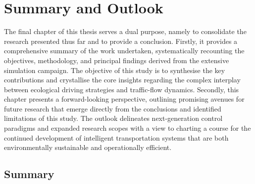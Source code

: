 \chapter{Summary and Outlook}
\label{ch:SummaryOutlook}

The final chapter of this thesis serves a dual purpose, namely to consolidate the research presented thus far and to provide a conclusion. Firstly, it provides a comprehensive summary of the work undertaken, systematically recounting the objectives, methodology, and principal findings derived from the extensive simulation campaign. The objective of this study is to synthesise the key contributions and crystallise the core insights regarding the complex interplay between ecological driving strategies and traffic-flow dynamics. Secondly, this chapter presents a forward-looking perspective, outlining promising avenues for future research that emerge directly from the conclusions and identified limitations of this study. The outlook delineates next-generation control paradigms and expanded research scopes with a view to charting a course for the continued development of intelligent transportation systems that are both environmentally sustainable and operationally efficient.

\section{Summary}
\label{sec:Summary}

